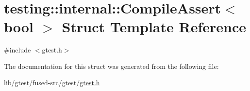 \hypertarget{structtesting_1_1internal_1_1_compile_assert}{\section{testing\-:\-:internal\-:\-:Compile\-Assert$<$ bool $>$ Struct Template Reference}
\label{structtesting_1_1internal_1_1_compile_assert}
}


{\ttfamily \#include $<$gtest.\-h$>$}



The documentation for this struct was generated from the following file\-:\begin{DoxyCompactItemize}
\item 
lib/gtest/fused-\/src/gtest/\hyperlink{fused-src_2gtest_2gtest_8h}{gtest.\-h}\end{DoxyCompactItemize}
